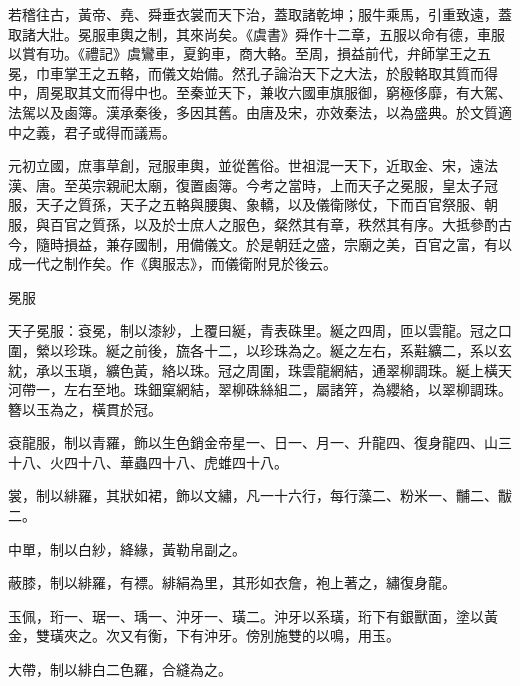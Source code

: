 
\begin{pinyinscope}

 若稽往古，黃帝、堯、舜垂衣裳而天下治，蓋取諸乾坤；服牛乘馬，引重致遠，蓋取諸大壯。冕服車輿之制，其來尚矣。《虞書》舜作十二章，五服以命有德，車服以賞有功。《禮記》虞鸞車，夏鉤車，商大輅。至周，損益前代，弁師掌王之五冕，巾車掌王之五輅，而儀文始備。然孔子論治天下之大法，於殷輅取其質而得中，周冕取其文而得中也。至秦並天下，兼收六國車旗服御，窮極侈靡，有大駕、法駕以及鹵簿。漢承秦後，多因其舊。由唐及宋，亦效秦法，以為盛典。於文質適中之義，君子或得而議焉。



 元初立國，庶事草創，冠服車輿，並從舊俗。世祖混一天下，近取金、宋，遠法漢、唐。至英宗親祀太廟，復置鹵簿。今考之當時，上而天子之冕服，皇太子冠服，天子之質孫，天子之五輅與腰輿、象轎，以及儀衛隊仗，下而百官祭服、朝服，與百官之質孫，以及於士庶人之服色，粲然其有章，秩然其有序。大抵參酌古今，隨時損益，兼存國制，用備儀文。於是朝廷之盛，宗廟之美，百官之富，有以成一代之制作矣。作《輿服志》，而儀衛附見於後云。



 冕服



 天子冕服：袞冕，制以漆紗，上覆曰綖，青表硃里。綖之四周，匝以雲龍。冠之口圍，縈以珍珠。綖之前後，旒各十二，以珍珠為之。綖之左右，系黈纊二，系以玄紞，承以玉瑱，纊色黃，絡以珠。冠之周圍，珠雲龍網結，通翠柳調珠。綖上橫天河帶一，左右至地。珠鈿窠網結，翠柳硃絲組二，屬諸笄，為纓絡，以翠柳調珠。簪以玉為之，橫貫於冠。



 袞龍服，制以青羅，飾以生色銷金帝星一、日一、月一、升龍四、復身龍四、山三十八、火四十八、華蟲四十八、虎蜼四十八。



 裳，制以緋羅，其狀如裙，飾以文繡，凡一十六行，每行藻二、粉米一、黼二、黻二。



 中單，制以白紗，絳緣，黃勒帛副之。



 蔽膝，制以緋羅，有褾。緋絹為里，其形如衣詹，袍上著之，繡復身龍。



 玉佩，珩一、琚一、瑀一、沖牙一、璜二。沖牙以系璜，珩下有銀獸面，塗以黃金，雙璜夾之。次又有衡，下有沖牙。傍別施雙的以鳴，用玉。



 大帶，制以緋白二色羅，合縫為之。




\end{pinyinscope}
